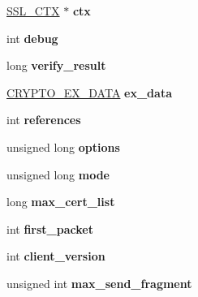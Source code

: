 \begin{DoxyCompactItemize}
\item 
\hypertarget{structssl__st_a5a3ac76eff749d5d3c9ecf6b1a230497}{}\hyperlink{structssl__ctx__st}{S\+S\+L\+\_\+\+C\+T\+X} $\ast$ {\bfseries ctx}\label{structssl__st_a5a3ac76eff749d5d3c9ecf6b1a230497}

\item 
\hypertarget{structssl__st_a44db2b5a38c43821c3a852669e48d67f}{}int {\bfseries debug}\label{structssl__st_a44db2b5a38c43821c3a852669e48d67f}

\item 
\hypertarget{structssl__st_a3092706c43455cf6a410853d90aadb1f}{}long {\bfseries verify\+\_\+result}\label{structssl__st_a3092706c43455cf6a410853d90aadb1f}

\item 
\hypertarget{structssl__st_ab71808924564517a2cfa30d1d5da910e}{}\hyperlink{structcrypto__ex__data__st}{C\+R\+Y\+P\+T\+O\+\_\+\+E\+X\+\_\+\+D\+A\+T\+A} {\bfseries ex\+\_\+data}\label{structssl__st_ab71808924564517a2cfa30d1d5da910e}

\item 
\hypertarget{structssl__st_ac62377797495ce179f0110cb70867ccc}{}int {\bfseries references}\label{structssl__st_ac62377797495ce179f0110cb70867ccc}

\item 
\hypertarget{structssl__st_a82c8bfd123603c23ccca6fb45be6d75f}{}unsigned long {\bfseries options}\label{structssl__st_a82c8bfd123603c23ccca6fb45be6d75f}

\item 
\hypertarget{structssl__st_a10add2996a9ac029c3a8a4c19587e1b0}{}unsigned long {\bfseries mode}\label{structssl__st_a10add2996a9ac029c3a8a4c19587e1b0}

\item 
\hypertarget{structssl__st_add94a8a6fe24dad252c559253d0eea9a}{}long {\bfseries max\+\_\+cert\+\_\+list}\label{structssl__st_add94a8a6fe24dad252c559253d0eea9a}

\item 
\hypertarget{structssl__st_ad3c31c44e1c20703dc023f4a14fa0d54}{}int {\bfseries first\+\_\+packet}\label{structssl__st_ad3c31c44e1c20703dc023f4a14fa0d54}

\item 
\hypertarget{structssl__st_af898db9604614a95a6830fbb5ce31850}{}int {\bfseries client\+\_\+version}\label{structssl__st_af898db9604614a95a6830fbb5ce31850}

\item 
\hypertarget{structssl__st_a201ff2c24c4a950fc529451563dac099}{}unsigned int {\bfseries max\+\_\+send\+\_\+fragment}\label{structssl__st_a201ff2c24c4a950fc529451563dac099}


\end{DoxyCompactItemize}
